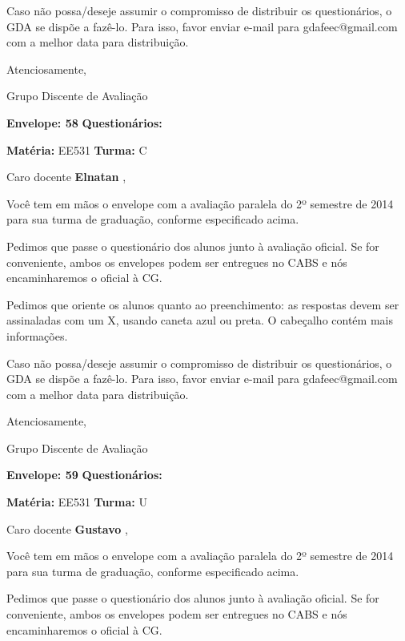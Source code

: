 \documentclass[a5paper]{letter}
\begin{document}
	Caso não possa/deseje assumir o compromisso de distribuir os questionários, o GDA se dispõe a fazê-lo. Para isso, favor enviar e-mail para gdafeec@gmail.com com a melhor data para distribuição.


Atenciosamente, 

Grupo Discente de Avaliação

\vspace{0.5cm}

{\bf Envelope: 58 }		\hfill	{\bf Questionários:} \hspace{2cm}

\newpage
\thispagestyle{empty}

\hfill {\bf Matéria:} EE531 {\bf Turma:} C

Caro docente {\bf Elnatan }, 

	Você tem em mãos o envelope com a avaliação paralela do 2º semestre de 2014 para sua turma de graduação, conforme especificado acima.

	Pedimos que passe o questionário dos alunos junto à avaliação oficial. Se for conveniente, ambos os envelopes podem ser entregues no CABS e nós encaminharemos o oficial à CG.

Pedimos que oriente os alunos quanto ao preenchimento: as respostas devem ser assinaladas com um X, usando caneta azul ou preta. O cabeçalho contém mais informações.

	Caso não possa/deseje assumir o compromisso de distribuir os questionários, o GDA se dispõe a fazê-lo. Para isso, favor enviar e-mail para gdafeec@gmail.com com a melhor data para distribuição.


Atenciosamente, 

Grupo Discente de Avaliação

\vspace{0.5cm}

{\bf Envelope: 59 }		\hfill	{\bf Questionários:} \hspace{2cm}

\newpage
\thispagestyle{empty}

\hfill {\bf Matéria:} EE531 {\bf Turma:} U

Caro docente {\bf Gustavo }, 

	Você tem em mãos o envelope com a avaliação paralela do 2º semestre de 2014 para sua turma de graduação, conforme especificado acima.

	Pedimos que passe o questionário dos alunos junto à avaliação oficial. Se for conveniente, ambos os envelopes podem ser entregues no CABS e nós encaminharemos o oficial à CG.
\end{document}

